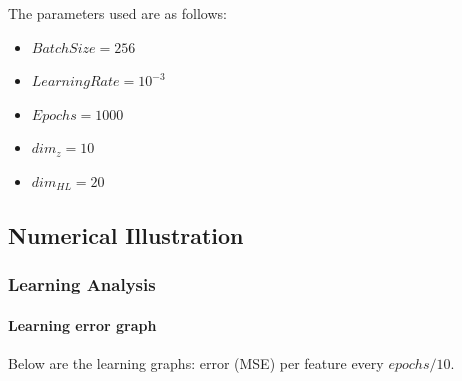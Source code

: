 \documentclass{article}
\theoremstyle{definition}
\begin{document}
The parameters used are as follows:

\begin{itemize}
    \item $BatchSize = 256$
    \item $LearningRate = 10^{-3}$
    \item $Epochs = 1000$
    \item $dim_z = 10$
    \item $dim_{HL} = 20$
\end{itemize}



\subsection{Numerical Illustration} 

\subsubsection{Learning Analysis}

\paragraph{Learning error graph}
\label{learningGraph}

Below are the learning graphs: error (MSE) per feature every $epochs/10$.
\end{document}
